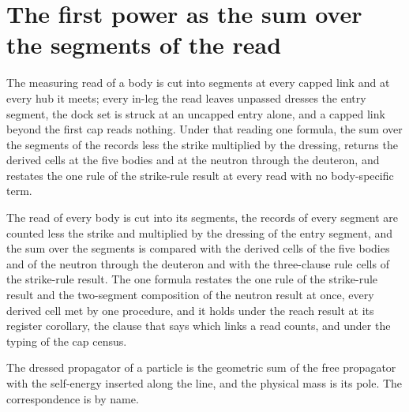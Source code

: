 \section{The first power as the sum over the segments of the read}\label{mod:VIII-1-D536716-ssfp-t1}
\begin{chtheorem}\label{box:VIII-1-D536716-ssfp-t1:1}
The measuring read of a body is cut into segments at every capped link and at every hub it meets; every in-leg the read leaves unpassed dresses the entry segment, the dock set is struck at an uncapped entry alone, and a capped link beyond the first cap reads nothing. Under that reading one formula, the sum over the segments of the records less the strike multiplied by the dressing, returns the derived cells at the five bodies and at the neutron through the deuteron, and restates the one rule of the strike-rule result at every read with no body-specific term.
\end{chtheorem}
The read of every body is cut into its segments, the records of every segment are counted less the strike and multiplied by the dressing of the entry segment, and the sum over the segments is compared with the derived cells of the five bodies and of the neutron through the deuteron and with the three-clause rule cells of the strike-rule result. The one formula restates the one rule of the strike-rule result and the two-segment composition of the neutron result at once, every derived cell met by one procedure, and it holds under the reach result at its register corollary, the clause that says which links a read counts, and under the typing of the cap census.
\begin{chbridge}
The dressed propagator of a particle is the geometric sum of the free propagator with the self-energy inserted along the line, and the physical mass is its pole. The correspondence is by name.
\end{chbridge}

